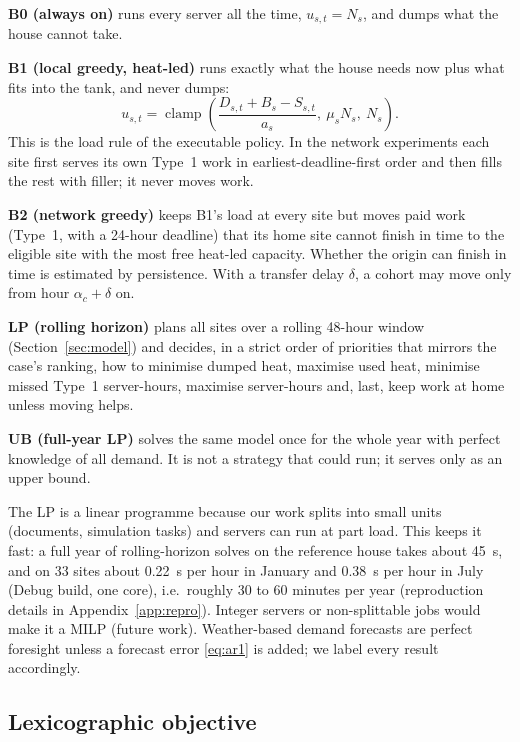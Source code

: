 \textbf{B0 (always on)} runs every server all the time, $u_{s,t} = N_s$, and dumps what the house
cannot take.

\textbf{B1 (local greedy, heat-led)} runs exactly what the house needs now plus what fits into the
tank, and never dumps:
\begin{equation}
  u_{s,t} = \operatorname{clamp}\!\left(\frac{D_{s,t} + B_s - S_{s,t}}{a_s},\ \mu_s N_s,\ N_s\right).
  \label{eq:greedy}
\end{equation}
This is the load rule of the executable policy. In the network experiments each site
first serves its own Type~1 work in earliest-deadline-first order and then fills the rest with
filler; it never moves work.

\textbf{B2 (network greedy)} keeps B1's load at every site but moves paid work (Type~1, with a
24-hour deadline) that its home site cannot finish in time to the eligible site with the most free
heat-led capacity. Whether the origin can finish in time is estimated by persistence. With a
transfer delay $\delta$, a cohort may move only from hour $\alpha_c + \delta$ on.

\textbf{LP (rolling horizon)} plans all sites over a rolling 48-hour window
(Section~\ref{sec:model}) and decides, in a strict order of priorities that mirrors the case's
ranking, how to minimise dumped heat, maximise used heat, minimise missed Type~1 server-hours, maximise
server-hours and, last, keep work at home unless moving helps.

\textbf{UB (full-year LP)} solves the same model once for the whole year with perfect knowledge of
all demand. It is not a strategy that could run; it serves only as an upper bound.

The LP is a linear programme because our work splits into small units (documents, simulation
tasks) and servers can run at part load. This keeps it fast: a full year of rolling-horizon solves
on the reference house takes about \qty{45}{s}, and on 33 sites about \qty{0.22}{s} per hour in
January and \qty{0.38}{s} per hour in July (Debug build, one core), i.e.\ roughly 30 to 60 minutes
per year (reproduction details in Appendix~\ref{app:repro}). Integer servers or non-splittable jobs would
make it a MILP (future work). Weather-based demand forecasts are perfect foresight unless a forecast
error \eqref{eq:ar1} is added; we label every result accordingly.

\subsection{Lexicographic objective}

